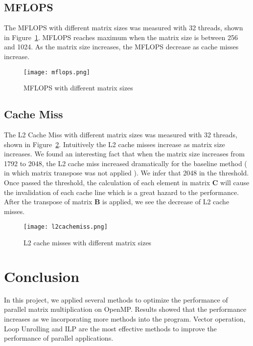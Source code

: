 \documentclass[12pt]{article}
\begin{document}
\subsection{MFLOPS}
The MFLOPS with different matrix sizes was measured with 32 threads, shown in 
Figure~\ref{fig:mflops}. MFLOPS reaches maximum when the matrix size is between
256 and 1024. As the matrix size increases, the MFLOPS decrease as cache misses
increase.
\begin{figure}[h!]
	\begin{center}
		\texttt{[image: mflops.png]}
		\caption{\label{fig:mflops}MFLOPS with different matrix sizes}
	\end{center}
\end{figure}

\subsection{Cache Miss}
The L2 Cache Miss with different matrix sizes was measured with 32 threads, 
shown in Figure~\ref{fig:l2cachemiss}. Intuitively the L2 cache misses increase
as matrix size increases. We found an interesting fact that when the matrix size
increases from 1792 to 2048, the L2 cache miss increased dramatically for the 
baseline method ( in which matrix transpose was not applied ). We infer that 
2048 in the threshold. Once passed the threshold, the calculation of each element 
in matrix $\mathbf{C}$ will cause the invalidation of each cache line which is 
a great hazard to the performance. After the transpose of matrix $\mathbf{B}$ 
is applied, we see the decrease of L2 cache misses.

\begin{figure}[h!]
	\begin{center}
		\texttt{[image: l2cachemiss.png]}
		\caption{\label{fig:l2cachemiss}L2 cache misses with different matrix sizes}
	\end{center}
\end{figure}

\section{Conclusion}
In this project, we applied several methods to optimize the performance of  
parallel matrix multiplication on OpenMP. Results showed that the performance
increases as we incorporating more methods into the program. Vector operation,
Loop Unrolling and ILP are the most effective methods to improve the
performance of parallel applications.
\end{document}
